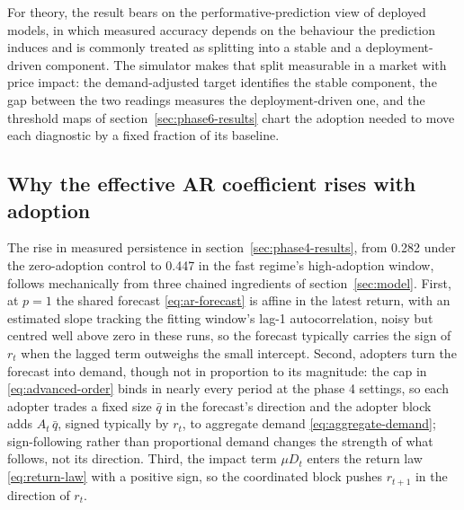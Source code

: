 \documentclass[12pt]{article}
\begin{document}
For theory, the result bears on the performative-prediction view of deployed models, in which measured accuracy depends on the behaviour the prediction induces and is commonly treated as splitting into a stable and a deployment-driven component. The simulator makes that split measurable in a market with price impact: the demand-adjusted target identifies the stable component, the gap between the two readings measures the deployment-driven one, and the threshold maps of section~\ref{sec:phase6-results} chart the adoption needed to move each diagnostic by a fixed fraction of its baseline. %

\subsection{Why the effective AR coefficient rises with adoption}\label{sec:discussion-phi}

The rise in measured persistence in section~\ref{sec:phase4-results}, from 0.282 under the zero-adoption control to 0.447 in the fast regime's high-adoption window, follows mechanically from three chained ingredients of section~\ref{sec:model}. %
First, at $p=1$ the shared forecast \eqref{eq:ar-forecast} is affine in the latest return, with an estimated slope tracking the fitting window's lag-1 autocorrelation, noisy but centred well above zero in these runs, so the forecast typically carries the sign of $r_t$ when the lagged term outweighs the small intercept. %
Second, adopters turn the forecast into demand, though not in proportion to its magnitude: the cap in \eqref{eq:advanced-order} binds in nearly every period at the phase 4 settings, so each adopter trades a fixed size $\bar{q}$ in the forecast's direction and the adopter block adds $A_t\,\bar{q}$, signed typically by $r_t$, to aggregate demand \eqref{eq:aggregate-demand}; sign-following rather than proportional demand changes the strength of what follows, not its direction. %
Third, the impact term $\mu D_t$ enters the return law \eqref{eq:return-law} with a positive sign, so the coordinated block pushes $r_{t+1}$ in the direction of $r_t$. %
\end{document}
